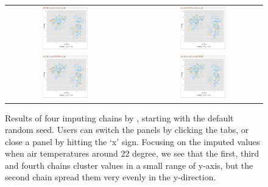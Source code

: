 \documentclass[article]{jss}
\begin{document}
\begin{center}
\begin{figure}[!h]
\begin{centering}
\begin{tabular}{cccc}
\includegraphics[width=0.4\textwidth]{graph/fig10-1-chain} &  &  & \includegraphics[width=0.4\textwidth]{graph/fig10-2-chain}\tabularnewline
\includegraphics[width=0.4\textwidth]{graph/fig10-3-chain} &  &  & \includegraphics[width=0.4\textwidth]{graph/fig10-4-chain}\tabularnewline
\end{tabular}
\par\end{centering}
\caption{Results of four imputing chains by , starting
with the default random seed. Users can switch the panels by
clicking the tabs, or close a panel by hitting the `x' sign.
Focusing on the imputed values when air temperatures around
22 degree, we see that the first, third and fourth chains cluster
values in a small range of y-axis, but the second chain spread
them very evenly in the y-direction.}
\label{fig:chaintabs}
\end{figure}
\par\end{center}
\end{document}
